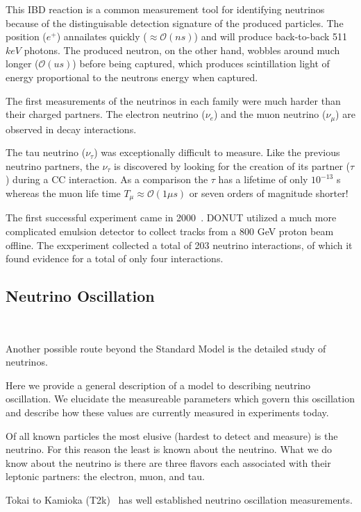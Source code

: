 This IBD reaction is a common measurement tool for identifying neutrinos because of the distinguisable detection signature of the produced particles.
The position ($e^{+}$) annailates quickly ($\approx \mathcal{O}(ns)$) and will produce back-to-back 511 $keV$ photons.
The produced neutron, on the other hand, wobbles around much longer ($\mathcal{O}(us)$) before being captured, which produces scintillation light of energy proportional to the neutrons energy when captured.

The first measurements of the neutrinos in each family were much harder than their charged partners.
The electron neutrino ($\nu_{e}$) and the muon neutrino ($\nu_{\mu}$) are observed in decay interactions.

The tau neutrino ($\nu_{\tau}$) was exceptionally difficult to measure.
Like the previous neutrino partners, the $\nu_{\tau}$ is discovered by looking for the creation of its partner ($\tau$) during a CC interaction.
As a comparison the $\tau$ has a lifetime of only $10^{-13}$ s whereas the muon life time $T_{\mu}\approx \mathcal{O}(1 \mu s)$ or seven orders of magnitude shorter!

The first successful experiment came in 2000~\citep{tau_neutrino_discovery_KODAMA2001218}.
DONUT utilized a much more complicated emulsion detector to collect tracks from a 800 GeV proton beam offline.
The exxperiment collected a total of 203 neutrino interactions, of which it found evidence for a total of only four interactions.

\subsection{Neutrino Oscillation}~\label{sec:neutrino_osc}

Another possible route beyond the Standard Model is the detailed study of neutrinos.

Here we provide a general description of a model to describing neutrino oscillation.
We elucidate the measureable parameters which govern this oscillation and describe how these values are currently measured in experiments today.

Of all known particles the most elusive (hardest to detect and measure) is the neutrino.
For this reason the least is known about the neutrino.
What we do know about the neutrino is there are three flavors each associated with their leptonic partners: the electron, muon, and tau.

Tokai to Kamioka (T2k)~\citep{PhysRevD.91.072010_t2k_2015} has well established neutrino oscillation measurements.

